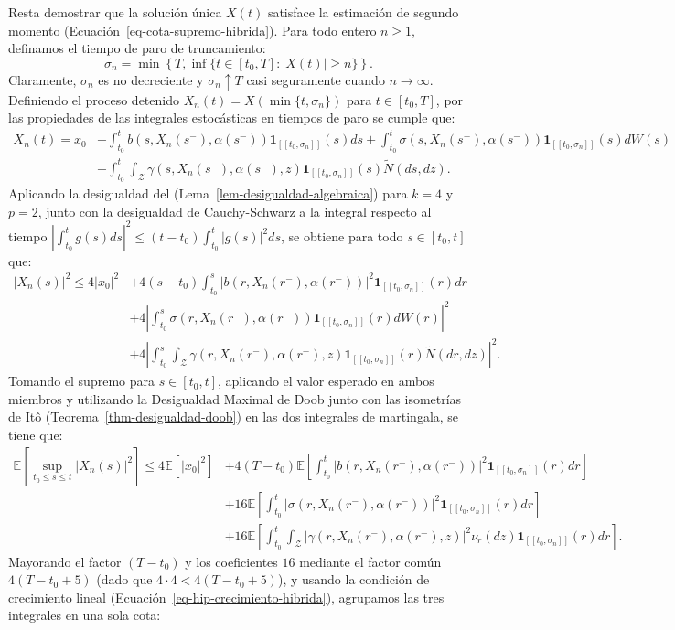 \documentclass[
  spanish,
  letterpaper,
  DIV=11,
  numbers=noendperiod]{scrreprt}
\theoremstyle{plain}
\theoremstyle{plain}
\theoremstyle{plain}
\theoremstyle{definition}
\theoremstyle{remark}
\begin{document}
Resta demostrar que la solución única \(X(t)\) satisface la estimación
de segundo momento (Ecuación~\ref{eq-cota-supremo-hibrida}). Para todo
entero \(n \ge 1\), definamos el tiempo de paro de truncamiento: \[
\sigma_n = \min\left\{T, \inf\{t \in [t_0, T] : \vert X(t) \vert \ge n\}\right\}.
\] Claramente, \(\sigma_n\) es no decreciente y \(\sigma_n \uparrow T\)
casi seguramente cuando \(n \to \infty\). Definiendo el proceso detenido
\(X_n(t) = X(\min\{t, \sigma_n\})\) para \(t \in [t_0, T]\), por las
propiedades de las integrales estocásticas en tiempos de paro se cumple
que: \[
\begin{aligned}
X_n(t) = x_0 & + \int_{t_0}^t b(s, X_n(s^-), \alpha(s^-))\mathbf{1}_{[[t_0, \sigma_n]]}(s) ds + \int_{t_0}^t \sigma(s, X_n(s^-), \alpha(s^-))\mathbf{1}_{[[t_0, \sigma_n]]}(s) dW(s) \\
& + \int_{t_0}^t \int_{\mathcal{Z}} \gamma(s, X_n(s^-), \alpha(s^-), z)\mathbf{1}_{[[t_0, \sigma_n]]}(s) \tilde{N}(ds, dz).
\end{aligned}
\] Aplicando la desigualdad del (Lema~\ref{lem-desigualdad-algebraica})
para \(k = 4\) y \(p = 2\), junto con la desigualdad de Cauchy-Schwarz a
la integral respecto al tiempo
\(\displaystyle \left\vert \int_{t_0}^t g(s) ds \right\vert^2 \le (t - t_0)\int_{t_0}^t \vert g(s) \vert^2 ds\),
se obtiene para todo \(s \in [t_0, t]\) que: \[
\begin{aligned}
\vert X_n(s) \vert^2 \le 4\vert x_0 \vert^2 & + 4(s - t_0) \int_{t_0}^s \vert b(r, X_n(r^-), \alpha(r^-)) \vert^2 \mathbf{1}_{[[t_0, \sigma_n]]}(r) dr \\
& + 4\left\vert \int_{t_0}^s \sigma(r, X_n(r^-), \alpha(r^-))\mathbf{1}_{[[t_0, \sigma_n]]}(r) dW(r) \right\vert^2 \\
& + 4\left\vert \int_{t_0}^s \int_{\mathcal{Z}} \gamma(r, X_n(r^-), \alpha(r^-), z)\mathbf{1}_{[[t_0, \sigma_n]]}(r) \tilde{N}(dr, dz) \right\vert^2.
\end{aligned}
\] Tomando el supremo para \(s \in [t_0, t]\), aplicando el valor
esperado en ambos miembros y utilizando la Desigualdad Maximal de Doob
junto con las isometrías de Itô (Teorema~\ref{thm-desigualdad-doob}) en
las dos integrales de martingala, se tiene que: \[
\begin{aligned}
\mathbb{E}\left[ \sup_{t_0 \le s \le t} \vert X_n(s) \vert^2 \right] \le 4\mathbb{E}[\vert x_0 \vert^2] & + 4(T - t_0) \mathbb{E}\left[ \int_{t_0}^t \vert b(r, X_n(r^-), \alpha(r^-)) \vert^2 \mathbf{1}_{[[t_0, \sigma_n]]}(r) dr \right] \\
& + 16\mathbb{E}\left[ \int_{t_0}^t \vert \sigma(r, X_n(r^-), \alpha(r^-)) \vert^2 \mathbf{1}_{[[t_0, \sigma_n]]}(r) dr \right] \\
& + 16\mathbb{E}\left[ \int_{t_0}^t \int_{\mathcal{Z}} \vert \gamma(r, X_n(r^-), \alpha(r^-), z) \vert^2 \nu_r(dz) \mathbf{1}_{[[t_0, \sigma_n]]}(r) dr \right].
\end{aligned}
\] Mayorando el factor \((T - t_0)\) y los coeficientes \(16\) mediante
el factor común \(4(T - t_0 + 5)\) (dado que
\(4 \cdot 4 < 4(T - t_0 + 5)\)), y usando la condición de crecimiento
lineal (Ecuación~\ref{eq-hip-crecimiento-hibrida}), agrupamos las tres
integrales en una sola cota:
\end{document}
